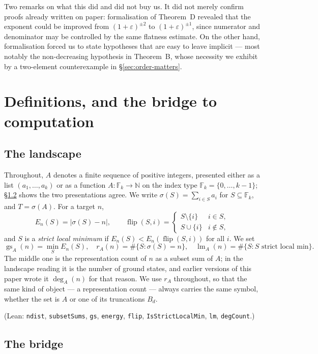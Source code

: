 \documentclass[11pt,a4paper]{article}
\theoremstyle{plain}
\theoremstyle{definition}
\theoremstyle{remark}
\DeclareMathOperator{\lm}{lm}
\DeclareMathOperator{\gs}{gs}
\newcommand{\Fk}{\mathbb{F}_k}
\newcommand{\Lean}[1]{\texttt{#1}}
\begin{document}
Two remarks on what this did and did not buy us. It did not merely confirm
proofs already written on paper: formalisation of Theorem~D revealed that the
exponent could be improved from $(1+\varepsilon)^{\pm2}$ to
$(1+\varepsilon)^{\pm1}$, since numerator and denominator may be controlled by
the same flatness estimate. On the other hand, formalisation forced us to state
hypotheses that are easy to leave implicit --- most notably the non-decreasing
hypothesis in Theorem~B, whose necessity we exhibit by a two-element
counterexample in \S\ref{sec:order-matters}.

\section{Definitions, and the bridge to computation}\label{sec:definitions}

\subsection{The landscape}

Throughout, $A$ denotes a finite sequence of positive integers, presented either
as a list $(a_1,\dots,a_k)$ or as a function $A:\Fk\to\mathbb{N}$ on the index
type $\Fk=\{0,\dots,k-1\}$; \S\ref{sec:bridge} shows the two presentations
agree. We write $\sigma(S)=\sum_{i\in S}a_i$ for $S\subseteq\Fk$, and
$T=\sigma(A)$. For a target $n$,
\[
  E_n(S)=|\sigma(S)-n|,
  \qquad
  \operatorname{flip}(S,i)=
  \begin{cases}S\setminus\{i\}&i\in S,\\ S\cup\{i\}&i\notin S,\end{cases}
\]
and $S$ is a \emph{strict local minimum} if $E_n(S)<E_n(\operatorname{flip}(S,i))$
for all $i$. We set
\[
  \gs_A(n)=\min_S E_n(S),\quad
  r_A(n)=\#\{S:\sigma(S)=n\},\quad
  \lm_A(n)=\#\{S:S\text{ strict local min}\}.
\]
The middle one is the representation count of $n$ as a subset sum of $A$; in the
landscape reading it is the number of ground states, and earlier versions of this
paper wrote it $\deg_A(n)$ for that reason. We use $r_A$ throughout, so that the
same kind of object --- a representation count --- always carries the same symbol,
whether the set is $A$ or one of its truncations $B_d$.

(Lean: \Lean{ndist}, \Lean{subsetSums}, \Lean{gs}, \Lean{energy}, \Lean{flip},
\Lean{IsStrictLocalMin}, \Lean{lm}, \Lean{degCount}.)

\subsection{The bridge}\label{sec:bridge}
\end{document}
